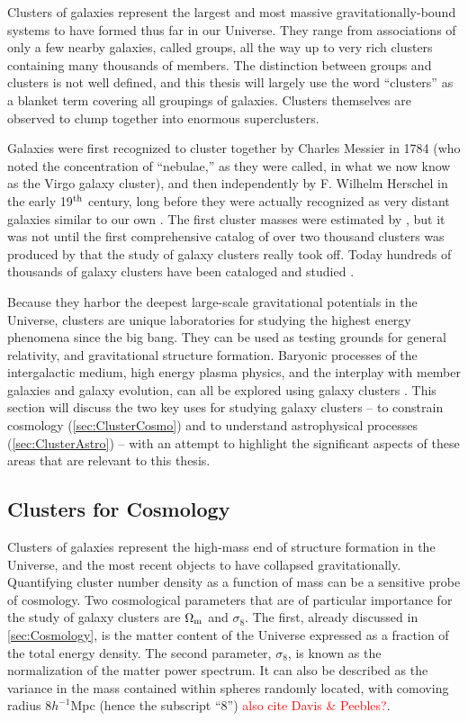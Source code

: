 Clusters of galaxies represent the largest and most massive gravitationally-bound systems to have formed thus far in our Universe. They range from associations of only a few nearby galaxies, called groups, all the way up to very rich clusters containing many thousands of members. The distinction between groups and clusters is not well defined, and this thesis will largely use the word ``clusters'' as a blanket term covering all groupings of galaxies. Clusters themselves are observed to clump together into enormous superclusters.

Galaxies were first recognized to cluster together by Charles Messier in 1784 (who noted the concentration of ``nebulae,'' as they were called, in what we now know as the Virgo galaxy cluster), and then independently by F. Wilhelm Herschel in the early 19$^{\rm th}$ century, long before they were actually recognized as very distant galaxies similar to our own \citep{Biviano00}. The first cluster masses were estimated by \citet{Zwicky33}, but it was not until the first comprehensive catalog of over two thousand clusters was produced by \citet{Abell58} that the study of galaxy clusters really took off. Today hundreds of thousands of galaxy clusters have been cataloged and studied \citep[see e.g.][]{Wen12}.

Because they harbor the deepest large-scale gravitational potentials in the Universe, clusters are unique laboratories for studying the highest energy phenomena since the big bang. They can be used as testing grounds for general relativity, and gravitational structure formation. Baryonic processes of the intergalactic medium, high energy plasma physics, and the interplay with member galaxies and galaxy evolution, can all be explored using galaxy clusters \citep{Kravtsov12}. This section will discuss the two key uses for studying galaxy clusters -- to constrain cosmology (\autoref{sec:ClusterCosmo}) and to understand astrophysical processes (\autoref{sec:ClusterAstro}) -- with an attempt to highlight the significant aspects of these areas that are relevant to this thesis.

\subsection{Clusters for Cosmology}
\label{sec:ClusterCosmo}
Clusters of galaxies represent the high-mass end of structure formation in the Universe, and the most recent objects to have collapsed gravitationally. Quantifying cluster number density as a function of mass can be a sensitive probe of cosmology. Two cosmological parameters that are of particular importance for the study of galaxy clusters are $\Omega_{\rm m}$ and $\sigma_8$. The first, already discussed in \autoref{sec:Cosmology}, is the matter content of the Universe expressed as a fraction of the total energy density. The second parameter, $\sigma_8$, is known as the normalization of the matter power spectrum. It can also be described as the variance in the mass contained within spheres randomly located, with comoving radius $8 h^{-1}$Mpc (hence the subscript ``8'') \citep{White93} \textcolor{red}{also cite Davis \& Peebles?}.

